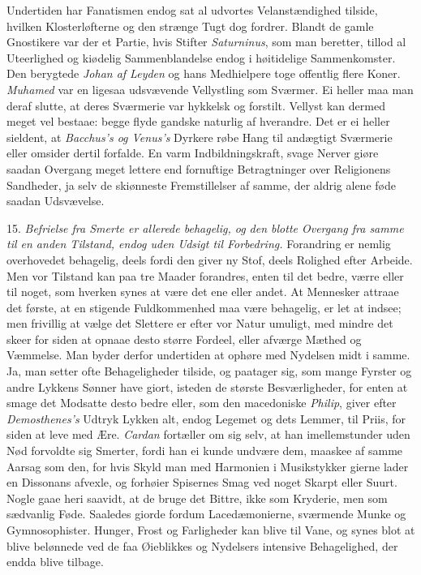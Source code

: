 \documentclass[12pt,a4paper]{article}
\newcommand{\opage}[1]{\marginnote{\footnotesize\textit{[#1]}}}
\begin{document}
Undertiden har Fanatismen endog sat al udvortes Velanstændighed tilside, hvilken
Klosterløfterne og den strænge Tugt dog fordrer. Blandt de gamle Gnostikere var der et
Partie, hvis Stifter \emph{Saturninus}, som man beretter, tillod al Uteerlighed og kiødelig
Sammenblandelse endog i høitidelige Sammenkomster. Den berygtede \emph{Johan af Leyden} og
hans Medhielpere toge offentlig flere Koner. \emph{Muhamed} var en ligesaa udsvævende
Vellystling som Sværmer. Ei heller maa man deraf slutte, at deres Sværmerie var hykkelsk og
forstilt. Vellyst kan dermed meget vel bestaae: begge flyde gandske naturlig af hverandre.
Det er ei heller sieldent, at \emph{Bacchus's og Venus's} Dyrkere røbe Hang til andægtigt
Sværmerie eller omsider dertil forfalde. En varm Indbildningskraft, svage Nerver giøre
saadan Overgang meget lettere end fornuftige Betragtninger over Religionens Sandheder, ja
selv de skiønneste Fremstillelser af samme, der aldrig alene føde saadan Udsvævelse.

15. \emph{Befrielse fra Smerte er allerede behagelig, og den blotte Overgang fra samme til
en anden Tilstand, endog uden Udsigt til Forbedring.} Forandring er nemlig overhovedet
behagelig, deels fordi den giver ny Stof, deels Rolighed efter Arbeide. Men vor Tilstand
kan
\opage{219} paa tre Maader forandres, enten til det bedre, værre eller til noget, som hverken synes at
være det ene eller andet. At Mennesker attraae det første, at en stigende Fuldkommenhed
maa være behagelig, er let at indsee; men frivillig at vælge det Slettere er efter vor
Natur umuligt, med mindre det skeer for siden at opnaae desto større Fordeel, eller
afværge Mæthed og Væmmelse. Man byder derfor undertiden at ophøre med Nydelsen midt i
samme. Ja, man setter ofte Behageligheder tilside, og paatager sig, som mange Fyrster og
andre Lykkens Sønner have giort, isteden de største Besværligheder, for enten at smage det
Modsatte desto bedre eller, som den macedoniske \emph{Philip}, giver efter
\emph{Demosthenes's} Udtryk Lykken alt, endog Legemet og dets Lemmer, til Priis, for siden
at leve med Ære. \emph{Cardan} fortæller om sig selv, at han imellemstunder uden Nød
forvoldte sig Smerter, fordi han ei kunde undvære dem, maaskee af samme Aarsag som den,
for hvis Skyld man med Harmonien i Musikstykker gierne lader en Dissonans afvexle, og
forhøier Spisernes Smag ved noget Skarpt eller Suurt. Nogle gaae heri saavidt, at de bruge
det Bittre, ikke som Kryderie, men som sædvanlig Føde. Saaledes giorde fordum
Lacedæmonierne, sværmende Munke og Gymnosophister. Hunger, Frost og Farligheder kan blive
til Vane, og synes blot at blive belønnede ved de faa Øieblikkes og Nydelsers intensive
Behagelighed, der endda blive tilbage.
\end{document}
